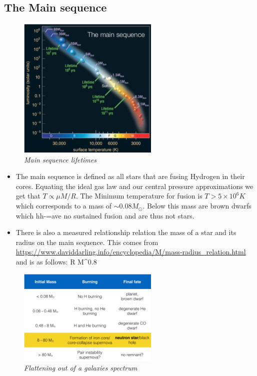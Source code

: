 \documentclass[11pt]{article}
\numberwithin{equation}{section}
\renewenvironment{flalign}{\empheq[box=\tcbhighmath]{align}}{\endempheq}
\begin{document}
\subsection{The Main sequence }
\begin{figure}[H]
\centering
\includegraphics[width=0.6\textwidth]{Graph2.png}
\caption{\label{fig:2}\emph{Main sequence lifetimes }}
\end{figure}
\begin{itemize}
    \item The main sequence is defined as all stars that are fusing Hydrogen in their cores.  Equating the ideal gas law and our central pressure approximations we get that $T \propto \mu M/R$. The Minimum temperature for fusion is $T > 5 \times 10^6 K$ which corresponds to a mass of $\sim 0.08 M_{\odot} $. Below this mass are brown dwarfs which hh-=ave no sustained fusion and are thus not stars. 

\item There is also a measured relationship relation the mass of a star and its radius on the main sequence. This comes from \url{https://www.daviddarling.info/encyclopedia/M/mass-radius_relation.html} and is as follows: 
\begin{flalign}
 R \propto M^{0.8}
\end{flalign}
\end{itemize}









\begin{figure}[H]
\centering
\includegraphics[width=0.6\textwidth]{image.png}
\caption{\label{fig:2}\emph{Flattening out of a galaxies spectrum}}
\end{figure}
\end{document}
